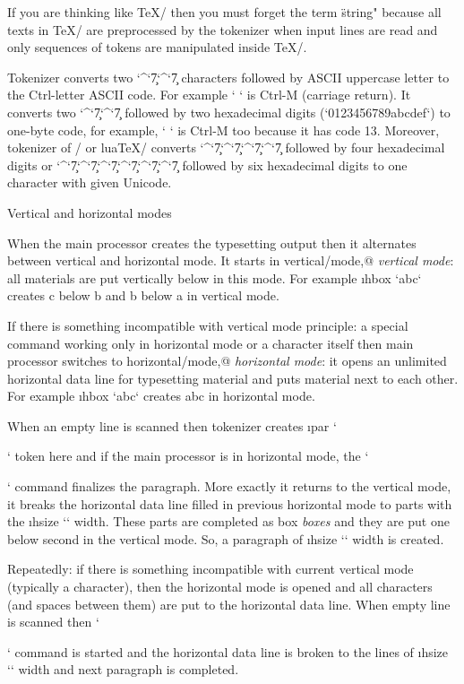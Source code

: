 If you are thinking like \TeX/ then you must forget the term \"string"
because all texts in \TeX/ are preprocessed by the tokenizer when input lines are
read and only sequences of tokens are manipulated inside \TeX/.

Tokenizer converts two `^`\c7`^`\c7 characters followed by ASCII uppercase
letter to the Ctrl-letter ASCII code. For example `^^M` is Ctrl-M (carriage
return). It converts two `^`\c7`^`\c7 followed by two hexadecimal digits 
(`0123456789abcdef`) to one-byte code, for example, `^^0d` is Ctrl-M too 
because it has code 13. Moreover, tokenizer of \XeTeX/ or lua\TeX/ converts
`^`\c7`^`\c7`^`\c7`^`\c7 followed by four hexadecimal digits or 
`^`\c7`^`\c7`^`\c7`^`\c7`^`\c7`^`\c7 followed by six hexadecimal digits to one
character with given Unicode.


\sec Vertical and horizontal modes

When the main processor creates the typesetting output then it alternates
between vertical and horizontal mode. It starts in \ii vertical/mode,@ {\em vertical mode}: all
materials are put vertically below in this mode. For example
\i hbox `\hbox{a}\hbox{b}\hbox{c}` creates c below b and b below a in vertical mode.

If there is something incompatible with vertical mode principle: a special
command working only in horizontal mode or a character itself 
then main processor switches to \ii horizontal/mode,@ {\em horizontal mode}: it opens 
an unlimited horizontal data line for
typesetting material and puts material next to each other. For example
\i hbox `\hbox{a}\hbox{b}\hbox{c}` creates abc in horizontal mode.

When an empty line is scanned then tokenizer creates \i par `\par` token here and
if the main processor is in horizontal mode, the `\par` command finalizes the
paragraph. More exactly it returns to the vertical mode, 
it breaks the horizontal data line filled in previous horizontal mode 
to parts with the \i hsize `\hsize` width. These parts are completed as 
\ii box {\em boxes} and they are put one below second in the vertical mode. So, a
paragraph of \i hsize `\hsize` width is created.

Repeatedly: if there is something incompatible with current vertical mode
(typically a character), then the horizontal mode is opened and all characters
(and spaces between them) are put to the horizontal data line. When empty line
is scanned then `\par` command is started and the horizontal 
data line is broken to the lines of \i hsize `\hsize` width and next paragraph 
is completed.


